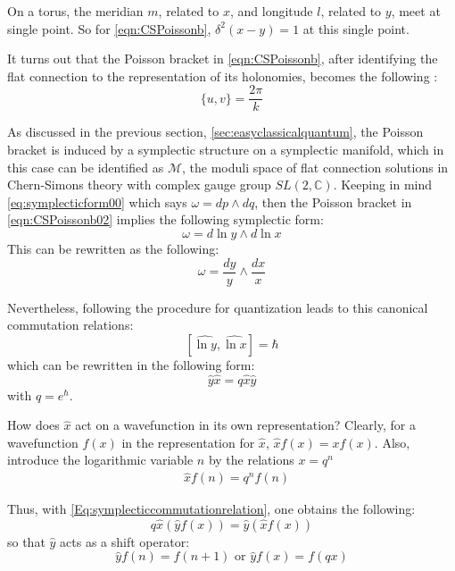 \documentclass[a4paper,titlepage,twoside]{book}
\begin{document}
On a torus, the meridian $m$, related to $x$, and longitude $l$, related to $y$, meet at single point.  So for \eqref{eqn:CSPoissonb}, $\delta^2{(x-y)} =1$ at this single point.  

It turns out that the Poisson bracket in \eqref{eqn:CSPoissonb}, after identifying the flat connection to the representation of its holonomies, becomes the following \cite{Gukov2005}:
\begin{equation}
  \lbrace u , v \rbrace  =\frac{2\pi}{k} \label{eqn:CSPoissonb02}
\end{equation}

As discussed in the previous section, \ref{sec:easyclassicalquantum}, the Poisson bracket is induced by a symplectic structure on a symplectic manifold, which in this case can be identified as $\mathcal{M}$, the moduli space of flat connection solutions in Chern-Simons theory with complex gauge group $SL{(2,\mathbb{C})}$.  Keeping in mind \eqref{eq:symplecticform00} which says $\omega = dp \wedge dq$, then the Poisson bracket in \eqref{eqn:CSPoissonb02} implies the following symplectic form:
\[
\omega = d\ln{y} \wedge d\ln{x}
\]
This can be rewritten as the following:
\begin{equation}
  \omega = \frac{dy}{y} \wedge \frac{dx}{x} \label{Eq:symplectic2form01}
\end{equation}

Nevertheless, following the procedure for quantization  leads to this canonical commutation relations:
\begin{equation}
  \left[ \widehat{\ln{y}}, \widehat{\ln{x}} \right] = \hbar
\end{equation}
which can be rewritten in the following form:
\begin{equation}
  \widehat{y}\widehat{x} = q \widehat{x} \widehat{y}   \label{Eq:symplecticcommutationrelation}
\end{equation} 
with $q = e^{\hbar}$.  

How does $\widehat{x}$ act on a wavefunction in its own representation?  Clearly, for a wavefunction $f(x)$ in the representation for $\widehat{x}$, $\widehat{x} f(x) = x f(x)$.  Also, introduce the logarithmic variable $n$ by the relations $x=q^n$
\begin{equation}
  \begin{aligned}
    & \widehat{x} f(n) = q^n f(n) 
\end{aligned}
\end{equation}

Thus, with \eqref{Eq:symplecticcommutationrelation}, one obtains the following:
\[
q\widehat{x} (\widehat{y}f(x)) = \widehat{y} ( \widehat{x} f(x))
\]
so that $\widehat{y}$ acts as a shift operator: 
\begin{equation}
  \widehat{y} f(n) = f(n+1) \text{ or } \widehat{y}f(x) = f(qx) \label{eq:yshift}
\end{equation}
\end{document}
